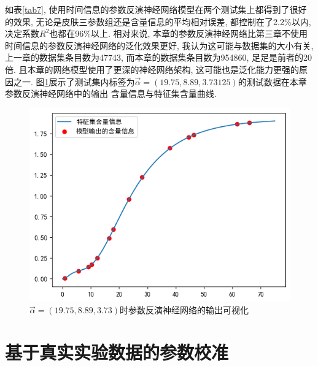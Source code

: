 \documentclass[a4paper,punct=banjiao,twoside]{ctexrep}
\theoremstyle{plain}
\theoremstyle{definition}
\theoremstyle{remark}
\begin{document}
如表\ref{tab7}, 使用时间信息的参数反演神经网络模型在两个测试集上都得到了很好的效果, 无论是皮肤三参数组还是含量信息的平均相对误差, 都控制在了2.2\%以内, 决定系数$R^2$也都在96\%以上. 相对来说, 本章的参数反演神经网络比第三章不使用时间信息的参数反演神经网络的泛化效果更好, 我认为这可能与数据集的大小有关, 上一章的数据集条目数为47743, 而本章的数据集条目数为954860, 足足是前者的20倍. 且本章的网络模型使用了更深的神经网络架构, 这可能也是泛化能力更强的原因之一.
图\ref{时间网络反演}展示了测试集内标签为$\vec{\alpha}=(19.75,8.89,3.73125)$的测试数据在本章参数反演神经网络中的输出
含量信息与特征集含量曲线.
\begin{figure}[H]
  \centering
  \includegraphics[scale=0.6]{./figs/p7.png}
  \caption{$\vec{\alpha}=(19.75,8.89,3.73)$时参数反演神经网络的输出可视化}
  \label{时间网络反演}
\end{figure}

\section{基于真实实验数据\cite{11}的参数校准}
\end{document}

